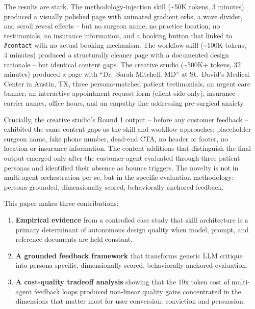 \documentclass[conference]{IEEEtran}
\providecommand{\tightlist}{%
  \setlength{\itemsep}{0pt}\setlength{\parskip}{0pt}}
\begin{document}
The results are stark. The methodology-injection skill (\textasciitilde50K tokens, 3 minutes) produced a visually polished page with animated gradient orbs, a wave divider, and scroll reveal effects -- but no surgeon name, no practice location, no testimonials, no insurance information, and a booking button that linked to \texttt{\#contact} with no actual booking mechanism. The workflow skill (\textasciitilde100K tokens, 4 minutes) produced a structurally cleaner page with a documented design rationale -- but identical content gaps. The creative studio (\textasciitilde500K+ tokens, 32 minutes) produced a page with ``Dr.~Sarah Mitchell, MD'' at St.~David's Medical Center in Austin, TX, three persona-matched patient testimonials, an urgent care banner, an interactive appointment request form (client-side only), insurance carrier names, office hours, and an empathy line addressing pre-surgical anxiety.

Crucially, the creative studio's Round 1 output -- before any customer feedback -- exhibited the same content gaps as the skill and workflow approaches: placeholder surgeon name, fake phone number, dead-end CTA, no header or footer, no location or insurance information. The content additions that distinguish the final output emerged only after the customer agent evaluated through three patient personas and identified their absence as bounce triggers. The novelty is not in multi-agent orchestration per se, but in the specific evaluation methodology: persona-grounded, dimensionally scored, behaviorally anchored feedback.

This paper makes three contributions:

\begin{enumerate}
\def\labelenumi{\arabic{enumi}.}
\tightlist
\item
  \textbf{Empirical evidence} from a controlled case study that skill architecture is a primary determinant of autonomous design quality when model, prompt, and reference documents are held constant.
\item
  \textbf{A grounded feedback framework} that transforms generic LLM critique into persona-specific, dimensionally scored, behaviorally anchored evaluation.
\item
  \textbf{A cost-quality tradeoff analysis} showing that the 10x token cost of multi-agent feedback loops produced non-linear quality gains concentrated in the dimensions that matter most for user conversion: conviction and persuasion.
\end{enumerate}
\end{document}
